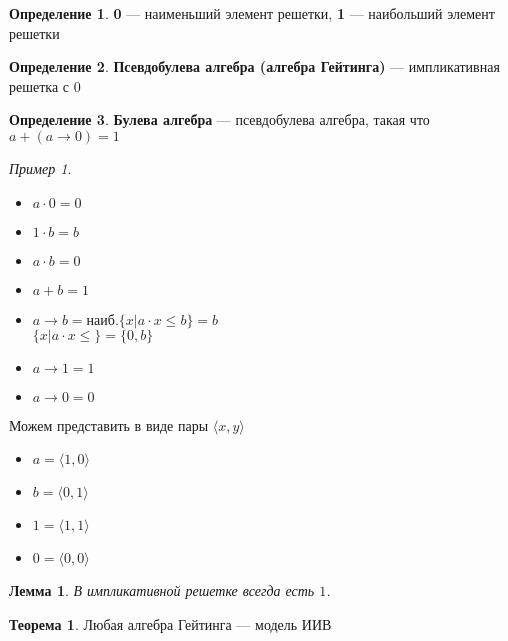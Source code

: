 \documentclass[english]{article}
\theoremstyle{plain}
\newtheorem{lemma}{Лемма}
\theoremstyle{remark}
\newtheorem*{examp}{Пример}
\theoremstyle{definition}
\newtheorem{theorem}{Теорема}[section]
\newtheorem*{definition}{Определение}
\begin{document}
\begin{definition}
\textbf{0} --- наименьший элемент решетки, \textbf{1} --- наибольший элемент решетки
\end{definition}
\begin{definition}
\textbf{Псевдобулева алгебра (алгебра Гейтинга)} --- импликативная решетка с \(0\)
\label{orgd9df8b5}
\end{definition}
\begin{definition}
\textbf{Булева алгебра} --- псевдобулева алгебра, такая что \(a + (a \to 0) = 1\)
\label{orgb2c8c0d}
\end{definition}
\begin{examp}
\-
\begin{center}
\end{center}
\begin{itemize}
\item \(a \cdot 0 = 0\)
\item \(1\cdot b = b\)
\item \(a \cdot b = 0\)
\item \(a + b = 1\)
\item \(a \to b = \text{наиб.}\{x \big| a\cdot x \le b\} = b\) \\
\(\{x \big| a \cdot x \le \} = \{0, b\}\)
\item \(a \to 1 = 1\)
\item \(a \to 0 = 0\)
\end{itemize}
Можем представить в виде пары \(\langle x, y \rangle\)
\begin{itemize}
\item \(a = \langle 1, 0 \rangle\)
\item \(b = \langle 0 , 1\rangle\)
\item \(1 = \langle 1, 1 \rangle\)
\item \(0 = \langle 0, 0 \rangle\)
\end{itemize}
\end{examp}
\begin{lemma}
В импликативной решетке всегда есть \(1\).
\end{lemma}
\begin{theorem}
Любая алгебра Гейтинга --- модель ИИВ
\end{theorem}
\end{document}

